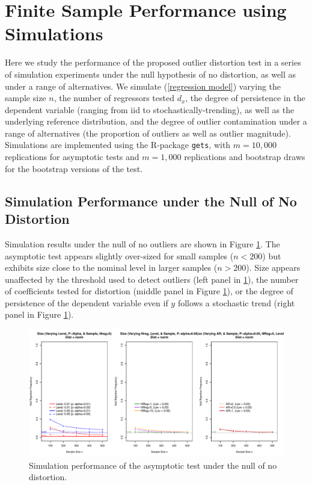 \documentclass[11pt, letterpaper]{article}
\numberwithin{algorithm}{section}
\numberwithin{assumption}{section}
\numberwithin{lemma}{section}
\numberwithin{theorem}{section}
\numberwithin{corollary}{section}
\numberwithin{remark}{section}
\numberwithin{equation}{section}
\numberwithin{figure}{section}
\numberwithin{table}{section}
\begin{document}
\section{Finite Sample Performance using Simulations} \label{sec_simulations}
Here we study the performance of the proposed outlier distortion test in a series of simulation experiments under the null hypothesis of no distortion, as well as under a range of alternatives. We simulate (\ref{regression model}) varying the sample size $n$, the number of regressors tested $d_x$, the degree of persistence in the dependent variable (ranging from iid to stochastically-trending), as well as the underlying reference distribution, and the degree of outlier contamination under a range of alternatives (the proportion of outliers as well as outlier magnitude). Simulations are implemented using the R-package  \texttt{gets}, with $m=10,000$ replications for asymptotic tests and $m=1,000$ replications and bootstrap draws for the bootstrap versions of the test.

\subsection{Simulation Performance under the Null of No Distortion}


Simulation results under the null of no outliers are shown in Figure \ref{fig_out_sim_null}. The asymptotic test appears slightly over-sized for small samples ($n<200$) but exhibits size close to the nominal level in larger samples ($n>200$). Size appears unaffected by the threshold used to detect outliers (left panel in \ref{fig_out_sim_null}), the number of coefficients tested for distortion (middle panel in Figure \ref{fig_out_sim_null}), or the degree of persistence of the dependent variable even if $y$ follows a stochastic trend (right panel in Figure \ref{fig_out_sim_null}).

\begin{figure}[!htbp]  %
\centering
\includegraphics[scale=0.6]{null_distnorm.pdf}
\caption{Simulation performance of the asymptotic test under the null of no distortion.}
\label{fig_out_sim_null}
\end{figure}
\end{document}
